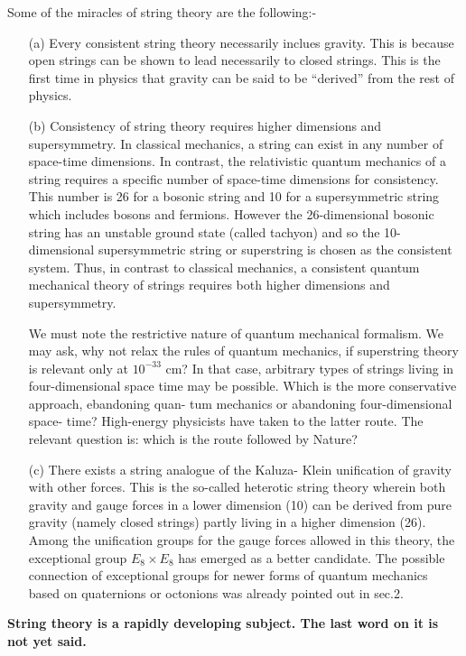 Some of the miracles of string theory are the following:-
\begin{itemize}
\item[(a)] Every consistent string theory necessarily inclues gravity. This is because open strings can be shown to lead necessarily to closed strings. This is the first time in physics that gravity can be said to be “derived” from the rest of physics.

\item[(b)] Consistency of string theory requires higher dimensions and supersymmetry. In classical mechanics, a string can exist in any number of space-time dimensions. In contrast, the relativistic quantum mechanics of a string requires a specific number of space-time dimensions for consistency. This number is 26 for a bosonic string and 10 for a supersymmetric string which includes bosons and fermions. However the 26-dimensional bosonic string has an unstable ground state (called tachyon) and so the 10-dimensional supersymmetric string or superstring is chosen as the consistent system.
Thus, in contrast to classical mechanics, a consistent quantum mechanical theory of strings requires both higher dimensions and supersymmetry.

We must note the restrictive nature of quantum mechanical formalism. We may ask,
why not relax the rules of quantum mechanics, if superstring theory is relevant only
at $10^{-33}$ cm? In that case, arbitrary types of strings living in four-dimensional space
time may be possible. Which is the more conservative approach, ebandoning quan-
tum mechanics or abandoning four-dimensional space- time? High-energy physicists
have taken to the latter route. The relevant question is: which is the route followed
by Nature? 

\item[(c)] There exists a string analogue of the Kaluza- Klein unification of gravity with other
forces. This is the so-called heterotic string theory wherein both gravity and gauge
forces in a lower dimension (10) can be derived from pure gravity (namely closed
strings) partly living in a higher dimension (26). Among the unification groups for
the gauge forces allowed in this theory, the exceptional group $E_{8} \times E_{8}$ has emerged
as a better candidate. The possible connection of exceptional groups for newer forms
of quantum mechanics based on quaternions or octonions was already pointed out in
sec.2.
\end{itemize}

\textbf{String theory is a rapidly developing subject. The last word on it is not yet said.}


